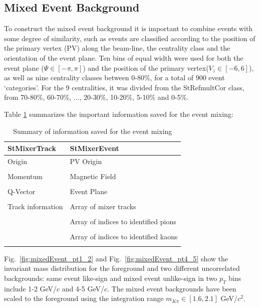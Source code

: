 \subsection{Mixed Event Background}

To construct the mixed event background it is important to combine events with some degree of similarity, such as events are classified according to the position of the primary vertex (PV) along the beam-line, the centrality class and the orientation of the event plane. Ten bins of equal width were used for both the event plane ($\Psi\in[-\pi,\pi]$) and the position of the primary vertex($V_z\in[-6,6]$), as well as nine centrality classes between 0-80\%, for a total of 900 event `categories'. For the 9 centralities, it was divided from the StRefmultCor class, from 70-80\%, 60-70\%, ..., 20-30\%, 10-20\%, 5-10\% and 0-5\%.

Table \ref{eventBuf} summarizes the important information saved for the event mixing:

\begin{table}[htp]
\centering
\caption{Summary of information saved for the event mixing}
\label{eventBuf}
\begin{tabular}{ l | l  }
\toprule[1.6pt]
StMixerTrack & StMixerEvent \\
\midrule[1.2pt]
Origin & PV Origin \\
\\
Momentum & Magnetic Field \\
\\
Q-Vector & Event Plane \\
\\
Track information & Array of mixer tracks \\
\\
  &Array of indices to identified pions \\
\\
  & Array of indices to identified kaons \\
\\
\bottomrule[1.6pt]
\end{tabular}
\end{table}

Fig.~\ref{fig:mixedEvent_pt1_2} and Fig.~\ref{fig:mixedEvent_pt4_5} show the invariant mass distribution for the foreground and two different uncorrelated backgrounds: same event like-sign and mixed event unlike-sign in two $p_T$ bins include 1-2 GeV/$c$ and 4-5 GeV/$c$. The mixed event backgrounds have been scaled to the foreground using the integration range $m_{K\pi}\in[1.6,2.1]$ GeV/$c^{2}$.


